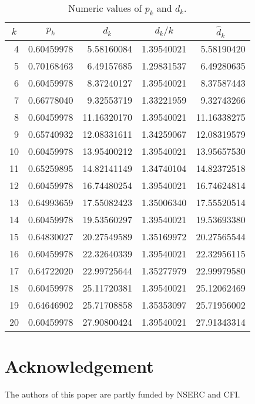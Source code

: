 \documentclass{patmorin}
\begin{document}
\begin{table}
   \begin{center}
     \begin{tabular}{r|r|r|r|r|}
       \multicolumn{1}{c|}{$k$} & \multicolumn{1}{c|}{$p_k$} & \multicolumn{1}{c|}{$d_k$} & \multicolumn{1}{c|}{$d_k/k$} & \multicolumn{1}{c|}{$\hat{d}_k$} \\ \hline
         4 & 0.60459978 &  5.58160084 & 1.39540021 &  5.58190420  \\
         5 & 0.70168463 &  6.49157685 & 1.29831537 &  6.49280635  \\
         6 & 0.60459978 &  8.37240127 & 1.39540021 &  8.37587443  \\
         7 & 0.66778040 &  9.32553719 & 1.33221959 &  9.32743266  \\
         8 & 0.60459978 & 11.16320170 & 1.39540021 & 11.16338275  \\
         9 & 0.65740932 & 12.08331611 & 1.34259067 & 12.08319579  \\
        10 & 0.60459978 & 13.95400212 & 1.39540021 & 13.95657530  \\
        11 & 0.65259895 & 14.82141149 & 1.34740104 & 14.82372518  \\
        12 & 0.60459978 & 16.74480254 & 1.39540021 & 16.74624814  \\
        13 & 0.64993659 & 17.55082423 & 1.35006340 & 17.55520514  \\
        14 & 0.60459978 & 19.53560297 & 1.39540021 & 19.53693380  \\
        15 & 0.64830027 & 20.27549589 & 1.35169972 & 20.27565544  \\
        16 & 0.60459978 & 22.32640339 & 1.39540021 & 22.32956115  \\
        17 & 0.64722020 & 22.99725644 & 1.35277979 & 22.99979580  \\
        18 & 0.60459978 & 25.11720381 & 1.39540021 & 25.12062469  \\
        19 & 0.64646902 & 25.71708858 & 1.35353097 & 25.71956002  \\
        20 & 0.60459978 & 27.90800424 & 1.39540021 & 27.91343314  
     \end{tabular}
   \end{center}
   \caption{Numeric values of $p_k$ and $d_k$.}
\end{table}


\section*{Acknowledgement}

The authors of this paper are partly funded by NSERC and CFI.



\end{document}
